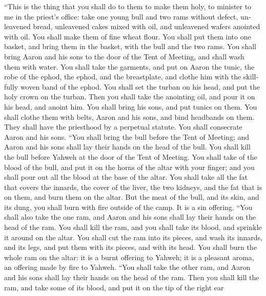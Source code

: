 \begin{paracol}{2}
\begin{otherlanguage}{english}
 ``This is the thing that you shall do to them to make
them holy, to minister to me in the priest's office: take one young bull
and two rams without defect,  unleavened bread, unleavened
cakes mixed with oil, and unleavened wafers anointed with oil. You shall
make them of fine wheat flour.  You shall put them into
one basket, and bring them in the basket, with the bull and the two
rams.  You shall bring Aaron and his sons to the door of
the Tent of Meeting, and shall wash them with water.  You
shall take the garments, and put on Aaron the tunic, the robe of the
ephod, the ephod, and the breastplate, and clothe him with the
skillfully woven band of the ephod.  You shall set the
turban on his head, and put the holy crown on the turban. 
Then you shall take the anointing oil, and pour it on his head, and
anoint him.  You shall bring his sons, and put tunics on
them.  You shall clothe them with belts, Aaron and his
sons, and bind headbands on them. They shall have the priesthood by a
perpetual statute. You shall consecrate Aaron and his sons.
 ``You shall bring the bull before the Tent of Meeting;
and Aaron and his sons shall lay their hands on the head of the bull.
 You shall kill the bull before Yahweh at the door of the
Tent of Meeting.  You shall take of the blood of the
bull, and put it on the horns of the altar with your finger; and you
shall pour out all the blood at the base of the altar. 
You shall take all the fat that covers the innards, the cover of the
liver, the two kidneys, and the fat that is on them, and burn them on
the altar.  But the meat of the bull, and its skin, and
its dung, you shall burn with fire outside of the camp. It is a sin
offering.  ``You shall also take the one ram, and Aaron
and his sons shall lay their hands on the head of the ram.
 You shall kill the ram, and you shall take its blood,
and sprinkle it around on the altar.  You shall cut the
ram into its pieces, and wash its innards, and its legs, and put them
with its pieces, and with its head.  You shall burn the
whole ram on the altar: it is a burnt offering to Yahweh; it is a
pleasant aroma, an offering made by fire to Yahweh. 
``You shall take the other ram, and Aaron and his sons shall lay their
hands on the head of the ram.  Then you shall kill the
ram, and take some of its blood, and put it on the tip of the right ear

\end{otherlanguage}
\end{paracol}
